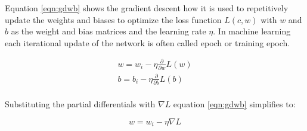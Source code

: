 Equation \ref{eqn:gdwb} shows the gradient descent how it is used to repetitively update the weights
and biases to optimize the loss function $L(c,w)$ with $w$ and $b$ as the weight and bias matrices
and the learning rate $\eta$. In machine learning each iterational update of the network is often
called epoch or training epoch.

\begin{subequations}
 \begin{align}
  w = w_i - \eta \frac{\partial}{\partial w}L(w) \\
  b = b_i - \eta \frac{\partial}{\partial b}L(b) \\
 \end{align}
 \label{eqn:gdwb}
\end{subequations}

Substituting the partial differentials with $\nabla L$ equation \ref{eqn:gdwb} simplifies to:

\begin{equation}
 w = w_i - \eta \nabla L
 \label{eqn:simplegd} 
\end{equation}

